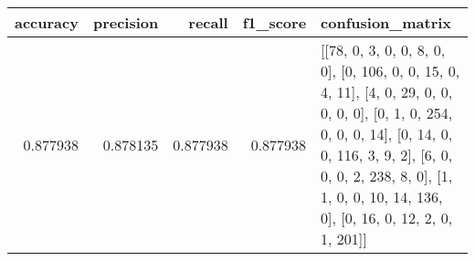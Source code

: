 \begin{tabular}{rrrrl}
\toprule
accuracy & precision & recall & f1_score & confusion_matrix \\
\midrule
0.877938 & 0.878135 & 0.877938 & 0.877938 & [[78, 0, 3, 0, 0, 8, 0, 0], [0, 106, 0, 0, 15, 0, 4, 11], [4, 0, 29, 0, 0, 0, 0, 0], [0, 1, 0, 254, 0, 0, 0, 14], [0, 14, 0, 0, 116, 3, 9, 2], [6, 0, 0, 0, 2, 238, 8, 0], [1, 1, 0, 0, 10, 14, 136, 0], [0, 16, 0, 12, 2, 0, 1, 201]] \\
\bottomrule
\end{tabular}
